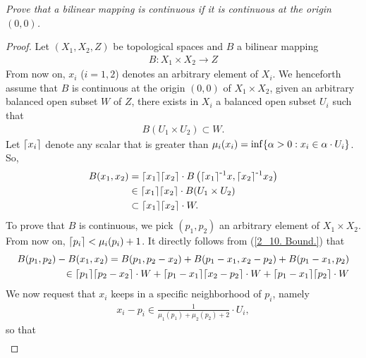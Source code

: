 \textit{%
Prove that a bilinear mapping is continuous %
if it is continuous at the origin $(0, 0)$.
}
\begin{proof}
Let $(X_1, X_2, Z)$ be topological spaces %
and $B$ a bilinear mapping %
%
  \begin{align}
    B: X_1 \times X_2 \to Z 
  \end{align}
%
From now on, $x_i$ ($i=1, 2$) denotes an arbitrary element of %
%
  $X_i$. %
%
We henceforth assume that $B$ is continuous at the origin %
%
  $(0, 0)$ of $X_1\times X_2$, \ie  %
%
given an arbitrary balanced open subset $W$ of $Z$, %
there exists in $X_i$ a balanced open subset $U_i$ such that %
%
  \begin{align}
    B(U_1 \times U_2) \subset W .
  \end{align}
%
Let $\lceil x_i \rceil$ denote any scalar that is greater than %
%
  $\mu_i(x_i) = \inf\{\alpha > 0: x_i \in \alpha \cdot U_i\}$. %
%
So, 
%
  \begin{align}
    B(x_1, x_2) 
      & = 
        \lceil x_1 \rceil\lceil x_2 \rceil 
            \cdot 
        B\left(
          \lceil x_1 \rceil^{\text{\small{-}} 1}x , 
          \lceil x_2 \rceil^{\text{\small{-}} 1} x_2
        \right) \\
      & \in 
    \lceil x_1 \rceil \lceil x_2 \rceil \cdot B(U_1 \times U_2) \\
    \label{2_10. Bound.}
      & \subset 
    \lceil x_1 \rceil \lceil x_2 \rceil \cdot W.
  \end{align}
To prove that $B$ is continuous, %
we pick $(p_1, p_2)$ an arbitrary element of $X_1\times X_2$. %
From now on, %
%
  $\lceil p_i \rceil < \mu_i(p_i) + 1$. 
%
It directly follows from (\ref{2_10. Bound.}) that %
%
  \begin{align}
    B(p_1, p_2) - B(x_1, x_2) 
      = B(p_1, p_2 - x_2) + B(p_1 -x_1, x_2 -p_2) + B(p_1-x_1,p_2) \\
      \label{2.10. In multiple of W.}
       \in  
         \lceil p_1 \rceil\lceil p_2 - x_2 \rceil\cdot W + 
         \lceil p_1 - x_1 \rceil\lceil x_2-p_2 \rceil \cdot W  + 
         \lceil p_1-x_1 \rceil\lceil p_2 \rceil \cdot W 
  \end{align}
%
We now request that $x_i$ keeps in a specific neighborhood of $p_i$, namely %
%
\begin{align}
  x_i -p_i \in \frac{1}{\mu_1(p_1) + \mu_2(p_2) + 2} \cdot U_i,   %
  \end{align}
%
so that 
%
\begin{align}

\end{align}
\end{proof}
